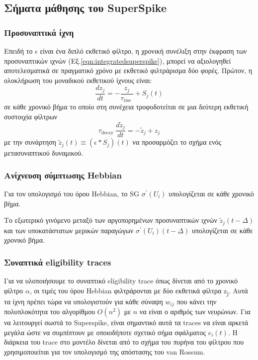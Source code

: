 \documentclass[12pt]{report}
\begin{document}
\subsection{Σήματα μάθησης του \textlatin{SuperSpike}}
\subsubsection{Προσυναπτικά ίχνη}
Επειδή το  $\epsilon$ είναι ένα διπλό εκθετικό φίλτρο, η χρονική συνέλιξη στην έκφραση των προσυναπτικών ιχνών (Εξ.\ref{eqn:integratedsuperspike}), μπορεί να αξιολογηθεί αποτελεσματικά σε πραγματικό χρόνο με εκθετικό φιλτράρισμα δύο φορές. Πρώτον, η ολοκλήρωση του μοναδικού εκθετικού ίχνους είναι:
\begin{equation}
\frac{d z_{j}}{d t}=-\frac{z_{j}}{\tau_{\text {rise }}}+S_{j}(t)
\end{equation}
σε κάθε χρονικό βήμα το οποίο στη συνέχεια τροφοδοτείται σε μια δεύτερη εκθετική συστοιχία φίλτρων
\begin{equation}
\tau_{\text {decay }} \frac{d \tilde{z}_{j}}{d t}=-\tilde{z}_{j}+z_{j}
\end{equation}
με την συνάρτηση $\tilde{z}_{j}(t) \equiv\left(\epsilon * S_{j}\right)(t)$ να προσαρμόζει το σχήμα ενός μετασυναπτικού δυναμικού.
\subsubsection{Ανίχνευση σύμπτωσης \textlatin{Hebbian}}
Για τον υπολογισμό του όρου \textlatin{Hebbian}, το \textlatin{SG} $\sigma^{\prime}\left(U_{i}\right)$ υπολογίζεται σε κάθε χρονικό βήμα.

Το εξωτερικό γινόμενο μεταξύ των αργοπορημένων προσυναπτικών ιχνών $\tilde{z}_{j}(t-\Delta)$ και των υποκατάστατων μερικών παραγώγων $\sigma^{\prime}\left(U_{i}\right)(t-\Delta)$  υπολογίζεται σε κάθε χρονικό βήμα.
\subsubsection{Συναπτικά \textlatin{eligibility traces} }
Για να υλοποιήσουμε το συναπτικό \textlatin{eligibility trace} όπως δίνεται από το χρονικό φίλτρο $\alpha$, οι τιμές του όρου \textlatin{Hebbian} φιλτράρονται με δύο εκθετικά φίλτρα z\textsubscript{\textlatin{j}}. Aυτά τα ίχνη πρέπει τώρα να υπολογιστούν για κάθε σύναψη $w_{i j}$  που κάνει την πολυπλοκότητα του αλγορίθμου $O\left(n^{2}\right)$ με $n$ να είναι ο αριθμός των νευρώνων. Για να λειτουργεί σωστά το \textlatin{Superspike}, είναι σημαντικό αυτά τα \textlatin{traces} να είναι αρκετά μεγάλα ώστε να συμπίπτουν με οποιοδήποτε σχετικό σήμα σφάλματος $e_{i}(t)$. Η διάρκεια του \textlatin{trace} στο μοντέλο δίνεται από το σχήμα του πυρήνα του φίλτρου που χρησιμοποιείται για τον υπολογισμό της απόστασης του \textlatin{van Rossum}.
\end{document}

